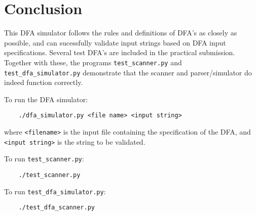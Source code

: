 \documentclass[11pt,a4paper]{article}
\begin{document}
\section{Conclusion}
This DFA simulator follows the rules and definitions of DFA's as closely as possible, and can sucessfully validate
input strings based on DFA input specifications.
Several test DFA's are included in the practical submission. Together with these, the programs \verb|test_scanner.py| and
\verb|test_dfa_simulator.py| demonstrate that the scanner and parser/simulator do indeed function correctly.

To run the DFA simulator:
\begin{verbatim}
	./dfa_simulator.py <file name> <input string>
\end{verbatim}
where \verb|<filename>| is the input file containing the specification of the DFA, and \verb|<input string>| is the string
to be validated.

To run \verb|test_scanner.py|:
\begin{verbatim}
	./test_scanner.py
\end{verbatim}

To run \verb|test_dfa_simulator.py|:
\begin{verbatim}
	./test_dfa_scanner.py
\end{verbatim}

\end{document}
